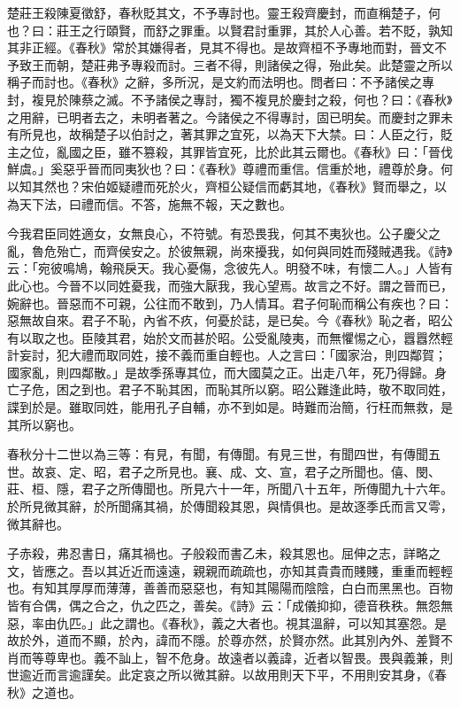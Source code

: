 

楚莊王殺陳夏徵舒，春秋貶其文，不予專討也。靈王殺齊慶封，而直稱楚子，何也？曰：莊王之行頤賢，而舒之罪重。以賢君討重罪，其於人心善。若不貶，孰知其非正經。《春秋》常於其嫌得者，見其不得也。是故齊桓不予專地而對，晉文不予致王而朝，楚莊弗予專殺而討。三者不得，則諸侯之得，殆此矣。此楚靈之所以稱子而討也。《春秋》之辭，多所況，是文約而法明也。問者曰：不予諸侯之專封，複見於陳蔡之滅。不予諸侯之專討，獨不複見於慶封之殺，何也？曰：《春秋》之用辭，已明者去之，未明者著之。今諸侯之不得專討，固已明矣。而慶封之罪未有所見也，故稱楚子以伯討之，著其罪之宜死，以為天下大禁。曰：人臣之行，貶主之位，亂國之臣，雖不篡殺，其罪皆宜死，比於此其云爾也。《春秋》曰：「晉伐鮮虞。」奚惡乎晉而同夷狄也？曰：《春秋》尊禮而重信。信重於地，禮尊於身。何以知其然也？宋伯姬疑禮而死於火，齊桓公疑信而虧其地，《春秋》賢而舉之，以為天下法，曰禮而信。不答，施無不報，天之數也。


今我君臣同姓適女，女無良心，不符號。有恐畏我，何其不夷狄也。公子慶父之亂，魯危殆亡，而齊侯安之。於彼無親，尚來擾我，如何與同姓而殘賊遇我。《詩》云：「宛彼鳴鳩，翰飛戾天。我心憂傷，念彼先人。明發不味，有懷二人。」人皆有此心也。今晉不以同姓憂我，而強大厭我，我心望焉。故言之不好。謂之晉而已，婉辭也。晉惡而不可親，公往而不敢到，乃人情耳。君子何恥而稱公有疾也？曰：惡無故自來。君子不恥，內省不疚，何憂於誌，是已矣。今《春秋》恥之者，昭公有以取之也。臣陵其君，始於文而甚於昭。公受亂陵夷，而無懼惕之心，囂囂然輕計妄討，犯大禮而取同姓，接不義而重自輕也。人之言曰：「國家治，則四鄰賀；國家亂，則四鄰散。」是故季孫專其位，而大國莫之正。出走八年，死乃得歸。身亡子危，困之到也。君子不恥其困，而恥其所以窮。昭公難逢此時，敬不取同姓，諜到於是。雖取同姓，能用孔子自輔，亦不到如是。時難而治簡，行枉而無救，是其所以窮也。


春秋分十二世以為三等：有見，有聞，有傳聞。有見三世，有聞四世，有傳聞五世。故哀、定、昭，君子之所見也。襄、成、文、宣，君子之所聞也。僖、閔、莊、桓、隱，君子之所傳聞也。所見六十一年，所聞八十五年，所傳聞九十六年。於所見微其辭，於所聞痛其禍，於傳聞殺其恩，與情俱也。是故逐季氏而言又雩，微其辭也。

子赤殺，弗忍書日，痛其禍也。子般殺而書乙未，殺其恩也。屈伸之志，詳略之文，皆應之。吾以其近近而遠遠，親親而疏疏也，亦知其貴貴而賤賤，重重而輕輕也。有知其厚厚而薄薄，善善而惡惡也，有知其陽陽而陰陰，白白而黑黑也。百物皆有合偶，偶之合之，仇之匹之，善矣。《詩》云：「成儀抑抑，德音秩秩。無怨無惡，率由仇匹。」此之謂也。《春秋》，義之大者也。視其溫辭，可以知其塞怨。是故於外，道而不顯，於內，諱而不隱。於尊亦然，於賢亦然。此其別內外、差賢不肖而等尊卑也。義不訕上，智不危身。故遠者以義諱，近者以智畏。畏與義兼，則世逾近而言逾謹矣。此定哀之所以微其辭。以故用則天下平，不用則安其身，《春秋》之道也。


